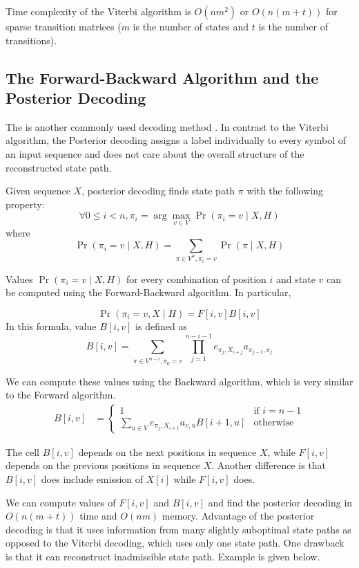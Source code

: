 Time complexity of the Viterbi algorithm is $O(nm^2)$ or $O(n(m+t))$ for sparse
transition matrices ($m$ is the number of states and $t$ is the number of
transitions).

\subsection{The Forward-Backward Algorithm and  the Posterior Decoding}

The  is another commonly used decoding method
\cite{Kall2005, Durbin1998}. In contrast to the Viterbi algorithm, the
Posterior decoding assigns a label individually to every symbol of an input
sequence and does not care about the overall structure of the reconstructed
state path. 

Given sequence $X$, posterior decoding finds state path $\pi$ with the following
property:
\[\forall 0\leq i< n, \pi_i=\arg\max_{v\in V}\Pr\left(\pi_i=v\mid X,H\right) \]
where \[\Pr\left(\pi_i=v\mid X,H\right) = \sum_{\pi\in V^n,\pi_i=v}\Pr\left(\pi\mid X,H\right)\]

Values $\Pr\left(\pi_i=v\mid X,H\right)$ for every
combination of position $i$ and state $v$ can be computed using the Forward-Backward
algorithm. In particular,

\begin{equation}
\Pr\left(\pi_i=v,X\mid H\right) =  F[i,v]B[i, v]
\end{equation}
In this formula, value $B[i, v]$ is defined as 
\begin{equation}
B[i, v] =	
					\sum_{\pi\in V^{n-i},\pi_0=v}
					\prod_{j=1}^{n-i-1} e_{\pi_j,X_{i+j}}a_{\pi_{j-1},\pi_j}
\end{equation}

We can compute 
these values using  the Backward algorithm, which is very similar to the Forward
algorithm. 
\begin{align}
B[i,v]&=
\begin{cases}
1 & \textrm{if $i=n-1$}\\
 \sum_{u\in V}
 	e_{\pi_j,X_{i+1}}a_{v,u}B[i+1,u] & \textrm{otherwise}
\end{cases}
\end{align}

The cell $B[i,v]$ depends on the next positions in sequence $X$,
while $F[i,v]$ depends on the previous positions in sequence $X$. Another
difference is that $B[i,v]$ does include emission of $X[i]$ while $F[i,v]$ does.

We can compute values of $F[i,v]$ and $B[i,v]$ and find the posterior decoding
in $O(n(m+t))$ time and $O(nm)$ memory.  Advantage of the posterior decoding is
that it uses information from many slightly suboptimal state paths as opposed
to the Viterbi decoding, which uses only one state path. One drawback is that
it can reconstruct inadmissible state path. Example is given below.



